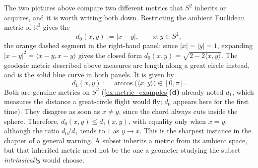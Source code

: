 \begin{remark}
\label{rem:sphere_two_metrics}
The two pictures above compare two different metrics that $S^2$ inherits or acquires, and it is
worth writing both down. Restricting the ambient Euclidean metric of $\mathbb{R}^3$ gives the
\[d_0(x,y) := |x-y|, \qquad x,y \in S^2,\]
the orange dashed segment in the right-hand panel; since $|x|=|y|=1$, expanding
$|x-y|^2 = \langle x-y,x-y\rangle$ gives the closed form
$d_0(x,y) = \sqrt{2-2\langle x,y\rangle}$. The geodesic metric described above measures arc length
along a great circle instead, and is the solid blue curve in both panels. It is given by
\[d_1(x,y) := \arccos\big(\langle x,y\rangle\big) \in [0,\pi].\]
Both are genuine metrics on $S^2$ (\cref{ex:metric_examples}\textbf{(d)} already noted $d_1$,
which measures the distance a great-circle flight would fly; $d_0$ appears here for the first
time). They disagree as soon as
$x \neq y$, since the chord always cuts inside the sphere. Therefore, $d_0(x,y) \leq d_1(x,y)$,
with equality only when $x = y$, although the ratio $d_0/d_1$ tends to $1$ as $y \to x$. This is the sharpest instance in the chapter of a
general warning. A subset inherits a metric from its ambient space, but that inherited metric need
not be the one a geometer studying the subset \emph{intrinsically} would choose.
\end{remark}

